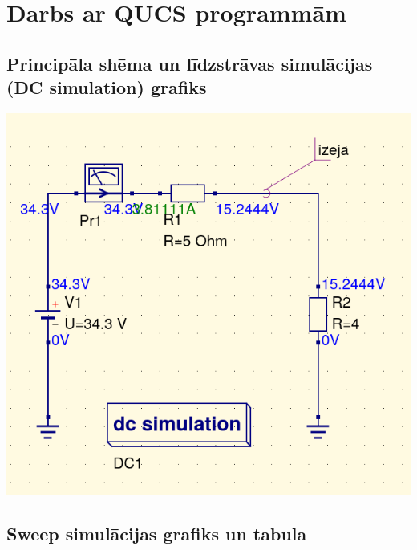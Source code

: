 \documentclass{report}
\begin{document}
\section{Darbs ar QUCS programmām}
\subsection{Principāla shēma un līdzstrāvas simulācijas (DC simulation) grafiks}
\includegraphics[width=15cm]{shema.png}

\subsection{Sweep simulācijas grafiks un tabula}
\end{document}
